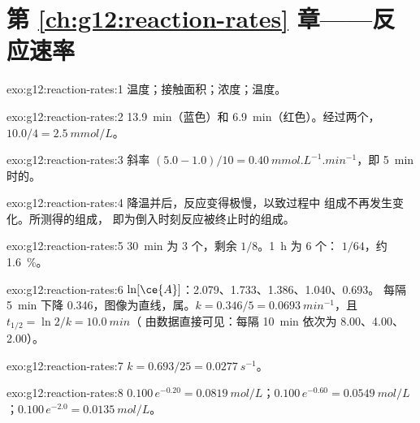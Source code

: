 \section*{第 \ref{ch:g12:reaction-rates} 章——反应速率}

\begin{solution}{exo:g12:reaction-rates:1}
温度；接触面积；浓度；温度。
\end{solution}

\begin{solution}{exo:g12:reaction-rates:2}
\qty{13.9}{min}（蓝色）和 \qty{6.9}{min}（红色）。经过两个，
$10.0 / 4 = \qty{2.5}{mmol/L}$。
\end{solution}

\begin{solution}{exo:g12:reaction-rates:3}
斜率 $(5.0 - 1.0)/10 = \qty{0.40}{mmol.L^{-1}.min^{-1}}$，即
\qty{5}{min} 时的。
\end{solution}

\begin{solution}{exo:g12:reaction-rates:4}
降温并后，反应变得极慢，以致过程中
组成不再发生变化。所测得的组成，
即为倒入时刻反应被终止时的组成。
\end{solution}

\begin{solution}{exo:g12:reaction-rates:5}
\qty{30}{min} 为 3 个，剩余 $1/8$。\qty{1}{h} 为 6 个：
$1/64$，约 \qty{1.6}{\percent}。
\end{solution}

\begin{solution}{exo:g12:reaction-rates:6}
$\ln[\ce{A}]$：2.079、1.733、1.386、1.040、0.693。
每隔 \qty{5}{min} 下降 0.346，图像为直线，属。$k = 0.346/5 =
\qty{0.0693}{min^{-1}}$，且 $t_{1/2} = \ln 2 / k = \qty{10.0}{min}$（
由数据直接可见：每隔 \qty{10}{min} 依次为 8.00、4.00、2.00）。
\end{solution}

\begin{solution}{exo:g12:reaction-rates:7}
$k = 0.693 / 25 = \qty{0.0277}{s^{-1}}$。
\end{solution}

\begin{solution}{exo:g12:reaction-rates:8}
$0.100\,e^{-0.20} = \qty{0.0819}{mol/L}$；$0.100\,e^{-0.60} =
\qty{0.0549}{mol/L}$；$0.100\,e^{-2.0} = \qty{0.0135}{mol/L}$。
\end{solution}

